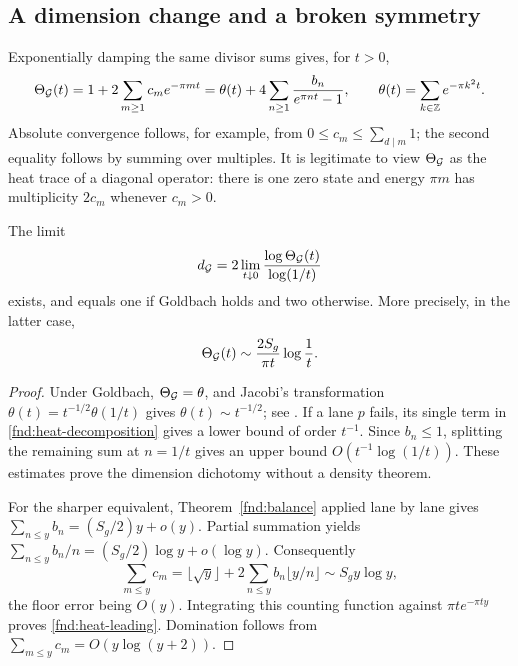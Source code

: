 \subsection{A dimension change and a broken symmetry}

Exponentially damping the same divisor sums gives, for $t>0$,
\begin{equation}
 \Theta_{\mathcal G}(t)=1+2\sum_{m\ge1}c_me^{-\pi mt}
 =\theta(t)+4\sum_{n\ge1}\frac{b_n}{e^{\pi nt}-1},
 \qquad
 \theta(t)=\sum_{k\in\mathbb Z}e^{-\pi k^2t}.
 \label{fnd:heat-decomposition}
\end{equation}
Absolute convergence follows, for example, from
$0\le c_m\le\sum_{d\mid m}1$; the second equality follows by
summing over multiples.  It is legitimate to view $\Theta_{\mathcal G}$ as
the heat trace of a diagonal operator: there is one zero state and
energy $\pi m$ has multiplicity $2c_m$ whenever $c_m>0$.

\begin{proposition}\label{fnd:dimension}
The limit
\[
 d_{\mathcal G}=2\lim_{t\downarrow0}\frac{\log\Theta_{\mathcal G}(t)}{\log(1/t)}
\]
exists, and equals one if Goldbach holds and two otherwise.
More precisely, in the latter case,
\begin{equation}
 \Theta_{\mathcal G}(t)\sim\frac{2S_g}{\pi t}\log\frac1t.
 \label{fnd:heat-leading}
\end{equation}
\end{proposition}
\begin{proof}
Under Goldbach, $\Theta_{\mathcal G}=\theta$, and Jacobi's transformation
$\theta(t)=t^{-1/2}\theta(1/t)$ gives
$\theta(t)\sim t^{-1/2}$; see \cite[20.7.32]{fndDLMF}.
If a lane $p$ fails, its single term in
\eqref{fnd:heat-decomposition} gives a lower bound of order
$t^{-1}$.  Since $b_n\le1$, splitting the remaining sum at
$n=1/t$ gives an upper bound $O(t^{-1}\log(1/t))$.
These estimates prove the dimension dichotomy without a density
theorem.

For the sharper equivalent, Theorem~\ref{fnd:balance} applied
lane by lane gives $\sum_{n\le y}b_n=(S_g/2)y+o(y)$.
Partial summation yields
$\sum_{n\le y}b_n/n=(S_g/2)\log y+o(\log y)$.
Consequently
\[
 \sum_{m\le y}c_m=\lfloor\sqrt y\rfloor+
 2\sum_{n\le y}b_n\lfloor y/n\rfloor
 \sim S_gy\log y,
\]
the floor error being $O(y)$.  Integrating this counting function
against $\pi t e^{-\pi ty}$ proves \eqref{fnd:heat-leading}.
Domination follows from $\sum_{m\le y}c_m=O(y\log(y+2))$.
\end{proof}

